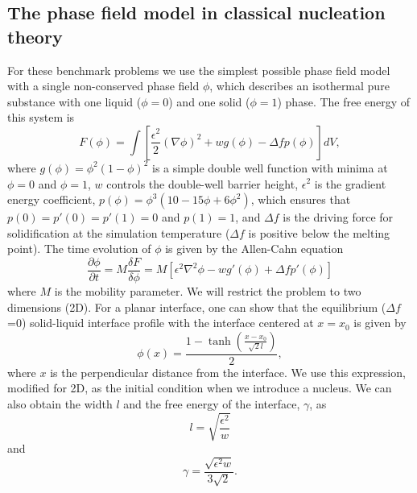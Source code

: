 \documentclass[preprint,12pt]{elsarticle}
\begin{document}
\subsection{The phase field model in classical nucleation theory}
For these benchmark problems we use the simplest possible phase field model with a single non-conserved phase field $\phi$, which describes an isothermal pure substance with one liquid ($\phi=0$) and one solid ($\phi=1$) phase. The free energy of this system is  
\begin{equation}
    F(\phi)=\int \left[\frac{\epsilon^2}{2}(\nabla \phi)^2+wg(\phi)-\Delta f p(\phi) \right]dV,
    \label{eqn:Fphi}
\end{equation}
where $g(\phi)=\phi^2(1-\phi)^2$ is a simple double well function with minima at $\phi=0$ and $\phi=1$, $ w$ controls the double-well barrier height, $\epsilon^2$ is the gradient energy coefficient, $p(\phi)=\phi^3(10-15\phi+6\phi^2)$, which ensures that $p(0)=p'(0)=p'(1)=0$ and $p(1)=1$, and $\Delta f$ is the driving force for solidification at the simulation temperature ($\Delta f$ is positive below the melting point). The time evolution of $\phi$ is given by the Allen-Cahn equation
\begin{equation}
    \frac{\partial \phi}{\partial t}=M\frac{\delta F}{\delta \phi}=M\left[\epsilon^2\nabla^2\phi-wg'(\phi)+\Delta fp'(\phi)\right]
    \label{eqn:dphidt}
\end{equation}
where $M$ is the mobility parameter. We will restrict the problem to two dimensions (2D). For a planar interface, one can show that the equilibrium ($\Delta f$=0) solid-liquid interface profile with the interface centered at $x=x_0$ is given by
\begin{equation}
    \phi(x)=\frac{1-\tanh\left(\frac{x-x_0}{\sqrt{2}l}\right)}{2},
    \label{eqn:phir}
\end{equation}
where $x$ is the perpendicular distance from the interface.
%
We use this expression, modified for 2D, as the initial condition when we introduce a nucleus. We can also obtain the width $l$ and the free energy of the interface, $\gamma$, as
\begin{equation}
    l=\sqrt{\frac{\epsilon^2}{w}}
    \label{eqn:l}
\end{equation}
and
\begin{equation}
    \gamma=\frac{\sqrt{\epsilon^2w}}{3\sqrt{2}}.
    \label{eqn:gamma}
\end{equation}
\end{document}
